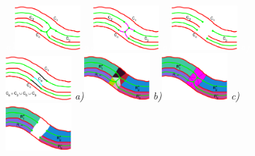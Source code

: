 \begin{figure}[!ht]
\centering
{\footnotesize\textit{\textcolor{white}{a)}}}\includegraphics[width=0.22\textwidth]{figs/lsc_zero_step.pdf} 
{\footnotesize\textit{\textcolor{white}{a)}}}\includegraphics[width=0.22\textwidth]{figs/lsc_first_step.pdf} 
{\footnotesize\textit{\textcolor{white}{a)}}}\includegraphics[width=0.22\textwidth]{figs/lsc_second_step.pdf}
{\footnotesize\textit{\textcolor{white}{a)}}}\includegraphics[width=0.22\textwidth]{figs/lsc_fourth_step.pdf}
\vspace{0.5cm}
{\footnotesize\textit{a)}}\includegraphics[width=0.22\textwidth]{figs/lsc_fifth_step.pdf}
{\footnotesize\textit{b)}}\includegraphics[width=0.22\textwidth]{figs/lsc_fifth_step_a.pdf}
{\footnotesize\textit{c)}}\includegraphics[width=0.22\textwidth]{figs/lsc_sixth_step.pdf}

\end{figure}
